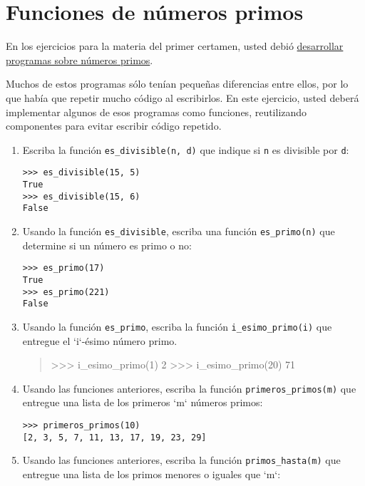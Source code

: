 \section{Funciones de números primos}

En los ejercicios para la materia del primer certamen, usted debió
\href{../1/numeros-primos.html}{desarrollar programas sobre números
primos}.

Muchos de estos programas sólo tenían pequeñas diferencias entre ellos,
por lo que había que repetir mucho código al escribirlos. En este
ejercicio, usted deberá implementar algunos de esos programas como
funciones, reutilizando componentes para evitar escribir código
repetido.

\begin{enumerate}
\item
  Escriba la función \lstinline!es_divisible(n, d)! que indique si
  \lstinline!n! es divisible por \lstinline!d!:

\begin{lstlisting}
>>> es_divisible(15, 5)
True
>>> es_divisible(15, 6)
False
\end{lstlisting}
\item
  Usando la función \lstinline!es_divisible!, escriba una función
  \lstinline!es_primo(n)! que determine si un número es primo o no:

\begin{lstlisting}
>>> es_primo(17)
True
>>> es_primo(221)
False
\end{lstlisting}
\item
  Usando la función \lstinline!es_primo!, escriba la función
  \lstinline!i_esimo_primo(i)! que entregue el `i`-ésimo número primo.

  \begin{quote}
  \textgreater{}\textgreater{}\textgreater{} i\_esimo\_primo(1) 2
  \textgreater{}\textgreater{}\textgreater{} i\_esimo\_primo(20) 71
  \end{quote}
\item
  Usando las funciones anteriores, escriba la función
  \lstinline!primeros_primos(m)! que entregue una lista de los primeros
  `m` números primos:

\begin{lstlisting}
>>> primeros_primos(10)
[2, 3, 5, 7, 11, 13, 17, 19, 23, 29]
\end{lstlisting}
\item
  Usando las funciones anteriores, escriba la función
  \lstinline!primos_hasta(m)! que entregue una lista de los primos
  menores o iguales que `m`:


\end{enumerate}
